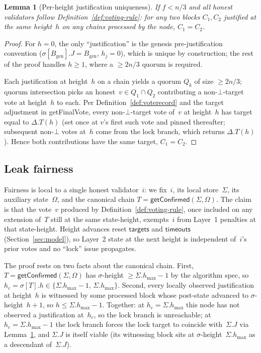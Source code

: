 \ifx\litemode\undefined\documentclass{article}\fi
\newcommand{\genesis}{\ensuremath{B_{\mathrm{gen}}}}
\newcommand{\targets}{\mathsf{targets}}
\newcommand{\timeouts}{\mathsf{timeouts}}
\newcommand{\hmax}{\ensuremath{h_{\max}}\xspace}
\newcommand{\getFinalVote}{\textsf{getFinalVote}\xspace}
\newcommand{\getConfirmed}{\textsf{getConfirmed}\xspace}
\theoremstyle{plain}
\newtheorem{lemma}{Lemma}
\theoremstyle{definition}
\theoremstyle{remark}
\begin{document}
\begin{lemma}[Per-height justification uniqueness]\label{lem:just-unique-height}
If $f < n/3$ and all honest validators follow Definition~\ref{def:voting-rule}: for any two blocks $C_1, C_2$ justified at the same height~$h$ on any chains processed by the node, $C_1 = C_2$.
\end{lemma}

\begin{proof}
For $h = 0$, the only ``justification'' is the genesis pre-justification convention ($\sigma[\genesis].J = \genesis$, $h_j = 0$), which is unique by construction; the rest of the proof handles $h \geq 1$, where a $\geq 2n/3$ quorum is required.

Each justification at height~$h$ on a chain yields a quorum $Q_k$ of size $\geq 2n/3$; quorum intersection picks an honest~$v \in Q_1 \cap Q_2$ contributing a non-$\bot$-target vote at height~$h$ to each.
Per Definition~\ref{def:voterecord} and the target adjustment in \getFinalVote, every non-$\bot$-target vote of~$v$ at height~$h$ has target equal to $\Delta.T(h)$ (set once at $v$'s first such vote and pinned thereafter; subsequent non-$\bot$ votes at~$h$ come from the lock branch, which returns $\Delta.T(h)$).
Hence both contributions have the same target, $C_1 = C_2$.
\end{proof}

\subsection{Leak fairness}

Fairness is local to a single honest validator~$i$: we fix~$i$, its local store~$\Sigma$, its auxiliary state~$\Omega$, and the canonical chain $T = \getConfirmed(\Sigma, \Omega)$.
The claim is that the vote~$v$ produced by Definition~\ref{def:voting-rule}, once included on any extension of~$T$ still at the same state-height, exempts~$i$ from Layer~1 penalties at that state-height.
Height advances reset $\targets$ and $\timeouts$ (Section~\ref{sec:model}), so Layer~2 state at the next height is independent of~$i$'s prior votes and no ``lock'' issue propagates.

The proof rests on two facts about the canonical chain.
First, $T = \getConfirmed(\Sigma,\Omega)$ has $\sigma$-height $\geq \Sigma.\hmax - 1$ by the algorithm spec, so $h_c = \sigma[T].h \in \{\Sigma.\hmax - 1,\, \Sigma.\hmax\}$.
Second, every locally observed justification at height~$h$ is witnessed by some processed block whose post-state advanced to $\sigma$-height~$h+1$, so $h \leq \Sigma.\hmax - 1$.
Together: at $h_c = \Sigma.\hmax$ this node has not observed a justification at~$h_c$, so the lock branch is unreachable; at $h_c = \Sigma.\hmax - 1$ the lock branch forces the lock target to coincide with~$\Sigma.J$ via Lemma~\ref{lem:just-unique-height}, and $\Sigma.J$ is itself viable (its witnessing block sits at $\sigma$-height~$\Sigma.\hmax$ as a descendant of~$\Sigma.J$).
\end{document}
